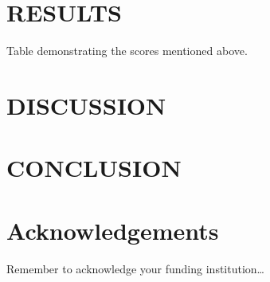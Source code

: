 \documentclass[10.7pt,]{article}
\begin{document}
\section{RESULTS}\label{results}
Table demonstrating the scores mentioned above.
%
%
%
\section{DISCUSSION}\label{discussion}
\lipsum[3-4]
%
%
%
\section{CONCLUSION}\label{conclusion}
\lipsum[3-4]
%
%
%
\section{Acknowledgements}\label{acknowledgements}
Remember to acknowledge your funding institution\ldots
%
%
%


\end{document}
